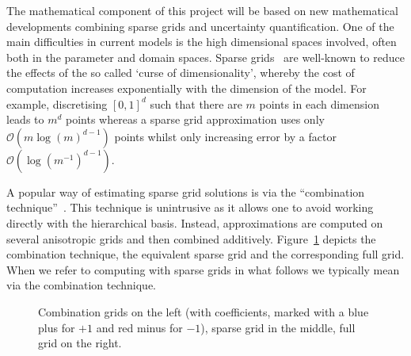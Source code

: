 \documentclass[a4paper,fontsize=12pt]{scrartcl}
\begin{document}
The mathematical component of this project will be based on new
mathematical developments combining sparse grids and uncertainty
quantification. One of the main difficulties in current models is the
high dimensional spaces involved, often both in the parameter and
domain spaces. Sparse grids~\parencite{BungartzGriebel2004} are
well-known to reduce the effects of the so called `curse of
dimensionality', whereby the cost of computation increases
exponentially with the dimension of the model. For example,
discretising $[0,1]^{d}$ such that there are $m$ points in each
dimension leads to $m^{d}$ points whereas a sparse grid approximation
uses only $\mathcal{O}(m\log(m)^{d-1})$ points whilst only increasing
error by a factor $\mathcal{O}(\log(m^{-1})^{d-1})$.

A popular way of estimating sparse grid solutions is via the
``combination technique''~\parencite{Griebel1990}. This technique is
unintrusive as it allows one to avoid working directly with the
hierarchical basis. Instead, approximations are computed on several
anisotropic grids and then combined additively.
Figure~\ref{fig:sparse_grids} depicts the combination technique, the
equivalent sparse grid and the corresponding full grid. When we refer
to computing with sparse grids in what follows we typically mean via
the combination technique.

\begin{figure}
  \centering
    
  \caption{Combination grids on the left (with coefficients, marked with
    a blue plus for $+1$ and red minus for $-1$), sparse grid in the
    middle, full grid on the right.}
  \label{fig:sparse_grids}
\end{figure}
\end{document}
